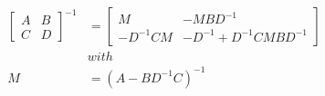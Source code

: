 \begin{lemma}

    \begin{align*}
        \left[\begin{array}{cc}
                  A&B\\
                  C&D
        \end{array}\right]^{-1}&=\left[\begin{array}{cc}
                                           M&-MBD^{-1}\\
                                           -D^{-1}CM&-D^{-1}+D^{-1}CMBD^{-1}
                                        \end{array}\right]\\
        &with\\
        M&=(A-BD^{-1}C)^{-1}
    \end{align*}

\end{lemma}


